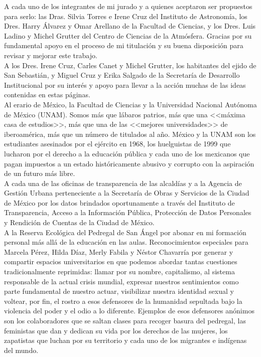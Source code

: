 A cada uno de los integrantes de mi jurado y a quienes aceptaron ser propuestos para serlo: las Dras. Silvia Torres e Irene Cruz del Instituto de Astronomía, los Dres. Harry Álvarez y Omar Arellano de la Facultad de Ciencias, y los Dres. Luis Ladino y Michel Grutter del Centro de Ciencias de la Atmósfera. Gracias por su fundamental apoyo en el proceso de mi titulación y su buena disposición para revisar y mejorar este trabajo.\\

A los Dres. Irene Cruz, Carles Canet y Michel Grutter, los habitantes del ejido de San Sebastián, y Miguel Cruz y Erika Salgado de la Secretaría de Desarrollo Institucional  por su interés y apoyo para llevar a la acción  muchas de las ideas contenidas en estas páginas.\\

Al erario de México, la Facultad de Ciencias y la Universidad Nacional Autónoma de México (UNAM). Somos más que lábaros patrios, más que una <<máxima casa de estudios>>, más que una de las <<mejores universidades>> de iberoamérica, más que un número de titulados al año. México y la UNAM son los estudiantes asesinados por el ejército en 1968, los huelguistas de 1999 que lucharon por el derecho a la educación pública y cada uno de los mexicanos que pagan impuestos a un estado históricamente abusivo y corrupto con la aspiración de un futuro más libre.\\

A cada una de las oficinas de transparencia de las alcaldías y a la Agencia de Gestión Urbana perteneciente a la Secretaría de Obras y Servicios de la Ciudad de México  por los datos brindados oportunamente a través del Instituto de Transparencia, Acceso a la Información Pública, Protección de Datos Personales y Rendición de Cuentas de la Ciudad de México.\\

A la Reserva Ecológica del Pedregal de San Ángel por abonar en mi formación personal más allá de la educación en las aulas. Reconocimientos especiales para Marcela Pérez, Hilda Díaz, Merly Fabila y Néstor Chavarría por generar y compartir espacios universitarios en que podemos abordar tantas cuestiones tradicionalmente reprimidas: llamar por su nombre, capitalismo, al sistema responsable de la actual crisis mundial, expresar nuestros sentimientos como parte fundamental de nuestro actuar, visibilizar nuestra identidad sexual y voltear, por fin, el rostro a esos defensores de la humanidad sepultada bajo la violencia del poder y el odio a lo diferente. Ejemplos de esos defensores anónimos son los colaboradores que se saltan clases para recoger basura del pedregal, las feministas que dan y dedican su vida por los derechos de las mujeres, los zapatistas que luchan por su territorio y cada uno de los migrantes e indígenas del mundo.\\

